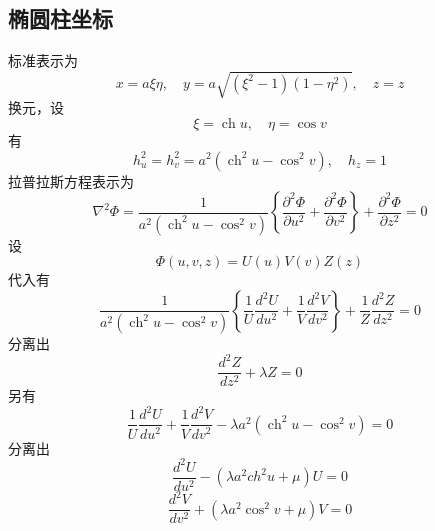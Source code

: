 \documentclass[a4paper]{ctexart}
\begin{document}
\subsection{椭圆柱坐标}
标准表示为
$$
x=a \xi \eta, \quad y=a \sqrt{\left(\xi^{2}-1\right)\left(1-\eta^{2}\right)}, \quad z=z
$$
换元，设
$$\xi=\operatorname{ch} u, \quad \eta=\cos v$$
有
$$
    h_{u}^{2}=h_{v}^{2}=a^{2}\left(\operatorname{ch}^{2} u-\cos ^{2} v\right), \quad h_{z}=1
$$
拉普拉斯方程表示为
$$
    \nabla^{2} \Phi=\frac{1}{a^{2}\left(\operatorname{ch}^{2} u-\cos ^{2} v\right)}\left\{\frac{\partial^{2} \Phi}{\partial u^{2}}+\frac{\partial^{2} \Phi}{\partial v^{2}}\right\}+\frac{\partial^{2} \Phi}{\partial z^{2}}=0
$$
设
$$
\Phi \left( u,v,z \right) =U\left( u \right) V\left( v \right) Z\left( z \right) 
$$
代入有
$$
\frac{1}{a^2\left( \operatorname{ch}^2u-\cos ^2v \right)}\left\{ \frac{1}{U}\frac{d^2U}{du^2}+\frac{1}{V}\frac{d^2V}{dv^2} \right\} +\frac{1}{Z}\frac{d^2Z}{dz^2}=0
$$
分离出
$$
\frac{d^2Z}{dz^2}+\lambda Z=0
$$
另有
$$
\frac{1}{U}\frac{d^2U}{du^2}+\frac{1}{V}\frac{d^2V}{dv^2}-\lambda a^2\left( \operatorname{ch}^2u-\cos ^2v \right) =0
$$
分离出
$$
\frac{d^2U}{du^2}-\left( \lambda a^2ch^2u+\mu \right) U=0
$$
$$
\frac{d^2V}{dv^2}+\left( \lambda a^2\cos ^2v+\mu \right) V=0
$$
\end{document}
